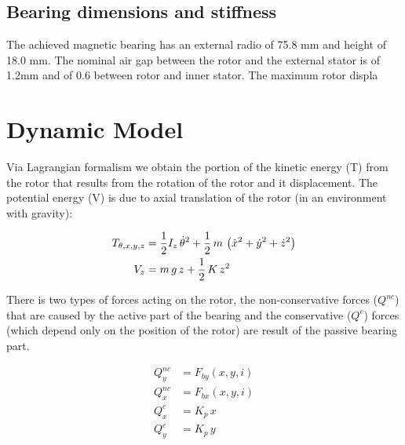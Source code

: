 \documentclass[10pt,fleqn,a4paper,twoside]{article}
\begin{document}
	
	
	\subsection{Bearing dimensions and stiffness}
	
	The achieved magnetic bearing has an external radio of 75.8 mm and height of 18.0 mm. The nominal air gap between the rotor and the external stator is of 1.2mm and of 0.6 between rotor and inner stator. The maximum rotor displa
	
	\section{Dynamic Model}
	
	Via Lagrangian formalism we obtain the portion of the kinetic energy (T) from the rotor that results from the rotation of the rotor and it displacement. The potential energy (V) is due to axial translation of the rotor (in an environment with gravity): 
	
	\begin{align}
		T_{\theta, x, y, z} &= \frac{1}{2} I_z \, \dot{\theta}^2 + \frac{1}{2} \, m \, \left( \dot{x}^2 + \dot{y}^2 + \dot{z}^2 \right) \notag \\
		V_z &= m \, g \, z + \frac{1}{2} \, K \, z^2
	\end{align}
	
	There is two types of forces acting on the rotor, the  non-conservative forces ($Q^{nc}$) that are caused by the active part of the bearing and the conservative ($Q^{c}$) forces (which depend only on the position of the rotor) are result of the passive bearing part.
	
	\begin{align}
		Q_y^{nc} &= F_{by}(x,y,i)  \\
		Q_x^{nc} &= F_{bx}(x,y,i)  \\
		Q^{c}_x &= K_p \, x \\
		Q^{c}_y &= K_p \, y 
	\end{align}
	
\end{document}
